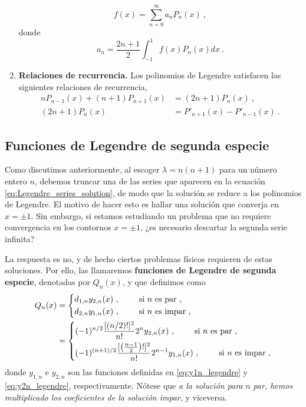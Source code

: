 \begin{enumerate}
    \begin{equation}
        f(x) = \sum_{n=0}^\infty a_n P_n(x) \ ,
    \end{equation}
    donde 
    \begin{equation}
        a_n = \frac{2n+1}{2} \int_{-1}^1 f(x) P_n(x) dx \ .
    \end{equation}
     
    \item \textbf{Relaciones de recurrencia.} Los polinomios de Legendre satisfacen las siguientes relaciones de recurrencia,
    \begin{align}
        n P_{n-1}(x) + (n+1) P_{n+1}(x) & = (2n+1) P_n(x) \ , \\
        (2n+1) P_n(x) & = P'_{n+1}(x) - P'_{n-1}(x) \ .
    \end{align}    
\end{enumerate}

\subsection{Funciones de Legendre de segunda especie}

Como discutimos anteriormente, al escoger $\lambda = n(n+1)$ para un número entero $n$, debemos truncar una de las series que aparecen en la ecuación \eqref{eq:Legendre_series_solution}, de modo que la solución se reduce a los polinomios de Legendre. El motivo de hacer esto es hallar una solución que converja en $x = \pm 1$. Sin embargo, si estamos estudiando un problema que no requiere convergencia en los contornos $x = \pm 1$, ¿es necesario descartar la segunda serie infinita?

La respuesta es no, y de hecho ciertos problemas físicos requieren de estas soluciones. Por ello, las llamaremos \textbf{funciones de Legendre de segunda especie}, denotadas por $Q_n(x)$, y que definimos como
\begin{align}
    Q_n(x) & = \begin{dcases}
        d_{1,n} y_{2,n}(x) \ , \qquad \text{ si } n \text{ es par} \ , \\
        d_{2,n} y_{1,n}(x) \ , \qquad \text{ si } n \text{ es impar} \ ,
    \end{dcases} \\
    & = \begin{dcases}
        (-1)^{n/2} \frac{[(n/2)!]^2}{n!} 2^n y_{2,n}(x) \ , \qquad \text{ si } n \text{ es par} \ , \\
        (-1)^{(n+1)/2} \frac{[\left(\frac{n-1}{2}\right)!]^2}{n!} 2^{n-1} y_{1,n}(x) \ , \qquad \text{ si } n \text{ es impar} \ ,
    \end{dcases}
\end{align}
donde $y_{1,n}$ e $y_{2,n}$ son las funciones definidas en \eqref{eq:y1n_legendre} y \eqref{eq:y2n_legendre}, respectivamente. Nótese que \emph{a la solución para} $n$ \emph{par, hemos multiplicado los coeficientes de la solución impar}, y viceversa.

